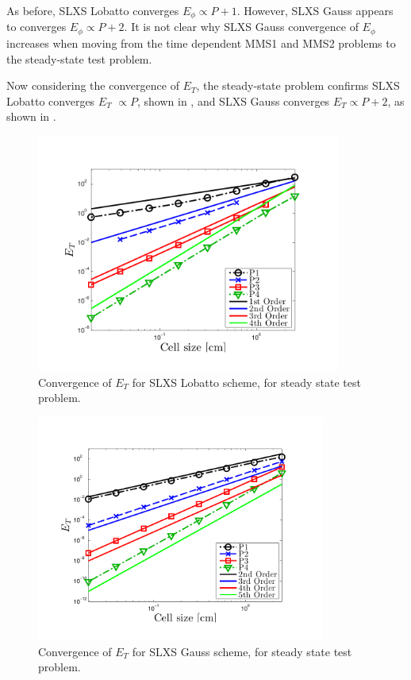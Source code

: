 As before, SLXS Lobatto converges $E_{\phi} \propto P+1$.  
However, SLXS Gauss appears to converges $E_{\phi} \propto P+2$.
It is not clear why SLXS Gauss convergence of $E_{\phi}$ increases when moving from the time dependent MMS1 and MMS2 problems to the steady-state test problem.

Now considering the convergence of $E_{T}$, the steady-state problem confirms SLXS Lobatto converges $E_T$ $\propto P$, shown in , and SLXS Gauss converges $E_T \propto P+2$, as shown in .
\begin{figure}[!htp]
\centering
\includegraphics[width=10cm,trim=0.25in  0.2in 0.75in 0.5in,clip=true]{chapter6_grey_radtran/Dissertation_Data/Constant_Time_SLXS_Lobatto_temp_L2.pdf}
\caption{Convergence of $E_{T}$ for SLXS Lobatto scheme, for steady state test problem.}
\label{fig:constant_time_lobatto_t}
\end{figure}
%
\begin{figure}[!hbp]
\centering
\includegraphics[width=9.5cm,trim=0.25in  0.2in 0.75in 0.5in,clip=true]{chapter6_grey_radtran/Dissertation_Data/Constant_Time_SLXS_Gauss_temp_L2.pdf}
\caption{Convergence of $E_{T}$ for SLXS Gauss scheme, for steady state test problem.}
\label{fig:constant_time_gauss_t}
\end{figure}

